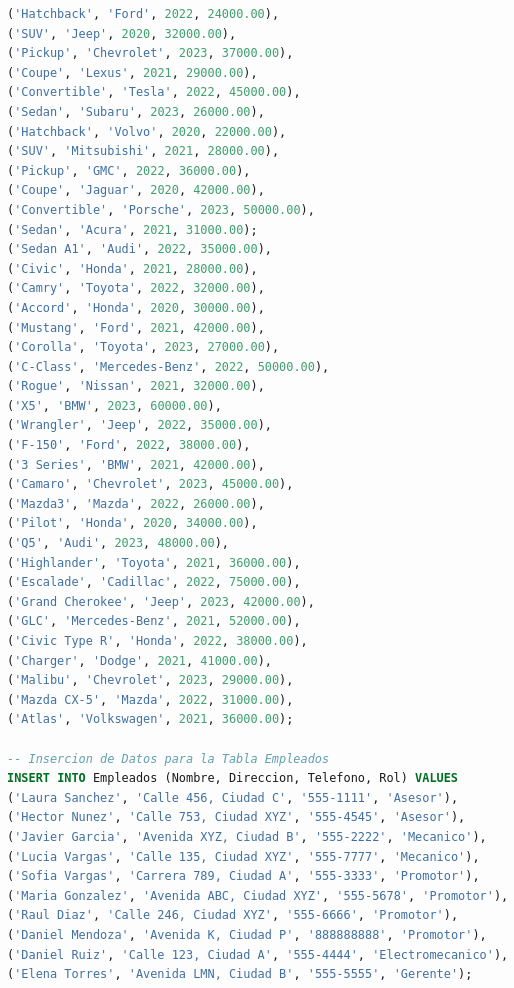 \documentclass[12pt]{article}
\begin{document}
\begin{lstlisting}[language=SQL]
('Hatchback', 'Ford', 2022, 24000.00),
('SUV', 'Jeep', 2020, 32000.00),
('Pickup', 'Chevrolet', 2023, 37000.00),
('Coupe', 'Lexus', 2021, 29000.00),
('Convertible', 'Tesla', 2022, 45000.00),
('Sedan', 'Subaru', 2023, 26000.00),
('Hatchback', 'Volvo', 2020, 22000.00),
('SUV', 'Mitsubishi', 2021, 28000.00),
('Pickup', 'GMC', 2022, 36000.00),
('Coupe', 'Jaguar', 2020, 42000.00),
('Convertible', 'Porsche', 2023, 50000.00),
('Sedan', 'Acura', 2021, 31000.00);
('Sedan A1', 'Audi', 2022, 35000.00),
('Civic', 'Honda', 2021, 28000.00),
('Camry', 'Toyota', 2022, 32000.00),
('Accord', 'Honda', 2020, 30000.00),
('Mustang', 'Ford', 2021, 42000.00),
('Corolla', 'Toyota', 2023, 27000.00),
('C-Class', 'Mercedes-Benz', 2022, 50000.00),
('Rogue', 'Nissan', 2021, 32000.00),
('X5', 'BMW', 2023, 60000.00),
('Wrangler', 'Jeep', 2022, 35000.00),
('F-150', 'Ford', 2022, 38000.00),
('3 Series', 'BMW', 2021, 42000.00),
('Camaro', 'Chevrolet', 2023, 45000.00),
('Mazda3', 'Mazda', 2022, 26000.00),
('Pilot', 'Honda', 2020, 34000.00),
('Q5', 'Audi', 2023, 48000.00),
('Highlander', 'Toyota', 2021, 36000.00),
('Escalade', 'Cadillac', 2022, 75000.00),
('Grand Cherokee', 'Jeep', 2023, 42000.00),
('GLC', 'Mercedes-Benz', 2021, 52000.00),
('Civic Type R', 'Honda', 2022, 38000.00),
('Charger', 'Dodge', 2021, 41000.00),
('Malibu', 'Chevrolet', 2023, 29000.00),
('Mazda CX-5', 'Mazda', 2022, 31000.00),
('Atlas', 'Volkswagen', 2021, 36000.00);

-- Insercion de Datos para la Tabla Empleados
INSERT INTO Empleados (Nombre, Direccion, Telefono, Rol) VALUES
('Laura Sanchez', 'Calle 456, Ciudad C', '555-1111', 'Asesor'),
('Hector Nunez', 'Calle 753, Ciudad XYZ', '555-4545', 'Asesor'),
('Javier Garcia', 'Avenida XYZ, Ciudad B', '555-2222', 'Mecanico'),
('Lucia Vargas', 'Calle 135, Ciudad XYZ', '555-7777', 'Mecanico'),
('Sofia Vargas', 'Carrera 789, Ciudad A', '555-3333', 'Promotor'),
('Maria Gonzalez', 'Avenida ABC, Ciudad XYZ', '555-5678', 'Promotor'),
('Raul Diaz', 'Calle 246, Ciudad XYZ', '555-6666', 'Promotor'),
('Daniel Mendoza', 'Avenida K, Ciudad P', '888888888', 'Promotor'),
('Daniel Ruiz', 'Calle 123, Ciudad A', '555-4444', 'Electromecanico'),
('Elena Torres', 'Avenida LMN, Ciudad B', '555-5555', 'Gerente');


\end{lstlisting}
\end{document}
